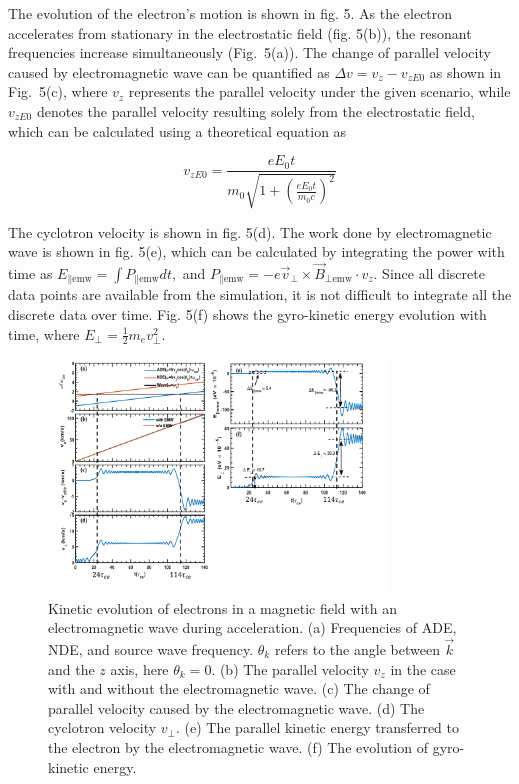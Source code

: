 \documentclass{cpbtex}
\begin{document}
\begin{CJK*}{GBK}{song}
\vspace{1em}

The evolution of the electron’s motion is shown in fig. 5. As the electron accelerates from stationary in the electrostatic field (fig. 5(b)), the resonant frequencies increase simultaneously (Fig.~5(a)). The change of parallel velocity caused by electromagnetic wave can be quantified as \( \Delta v = v_z - v_{zE0} \) as shown in Fig.~5(c), where \( v_z \) represents the parallel velocity under the given scenario, while \( v_{zE0} \) denotes the parallel velocity resulting solely from the electrostatic field, which can be calculated using a theoretical equation as

\begin{equation}
v_{zE0} = \frac{e E_0 t}{m_0 \sqrt{1 + \left( \frac{e E_0 t}{m_0 c} \right)^2 }}
\end{equation}

\vspace{1em}

The cyclotron velocity is shown in fig. 5(d). The work done by electromagnetic wave is shown in fig. 5(e), which can be calculated by integrating the power with time as 
\(
E_{\parallel \text{emw}} = \int P_{\parallel \text{emw}} dt ,
\)
and 
\(
P_{\parallel \text{emw}} = -e \vec{v}_\perp \times \vec{B}_{\perp \text{emw}} \cdot v_z.
\)
Since all discrete data points are available from the simulation, it is not difficult to integrate all the discrete data over time. Fig. 5(f) shows the gyro-kinetic energy evolution with time, where 
\(
E_\perp = \frac{1}{2} m_e v_\perp^2.
\)

\begin{figure}[ht]
\centering
\includegraphics[width=0.8\textwidth]{Figure5.pdf}%
\caption{\label{fig:NumSim}Kinetic evolution of electrons in a magnetic field with an electromagnetic wave during acceleration. 
    (a) Frequencies of ADE, NDE, and source wave frequency. $\theta_k$ refers to the angle between $\vec{k}$ and the $z$ axis, here $\theta_k = 0$. 
    (b) The parallel velocity $v_z$ in the case with and without the electromagnetic wave. 
    (c) The change of parallel velocity caused by the electromagnetic wave. 
    (d) The cyclotron velocity $v_\perp$. 
    (e) The parallel kinetic energy transferred to the electron by the electromagnetic wave. 
    (f) The evolution of gyro-kinetic energy.}
    \label{fig:kinetic_evolution}
\end{figure}



\end{CJK*}
\end{document}
